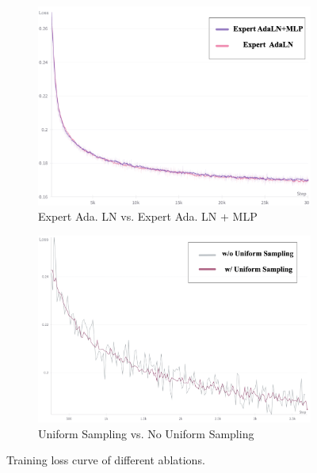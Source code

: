 \begin{figure}[h]
\begin{subfigure}[b]{0.46\textwidth}
        \includegraphics[width=\textwidth]{images/ab_ex.png}
        \caption{Expert Ada. LN vs. Expert Ada. LN + MLP}
        \label{fig:expert}
    \end{subfigure}
    \begin{subfigure}[b]{0.48\textwidth}
        \includegraphics[width=\textwidth]{images/ab_us.png}
        \caption{Uniform Sampling vs. No Uniform Sampling}
        \label{fig:uniform-sampling}
    \end{subfigure}

    \caption{Training loss curve of different ablations.}
    \label{fig:subfigures}
\end{figure}



